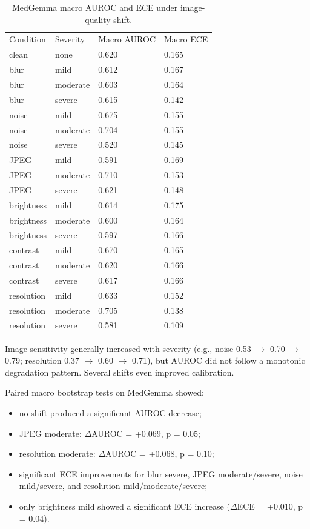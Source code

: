 \begin{table}[t]
\centering
\small
\begin{tabular}{llll}
\hline
Condition & Severity & Macro AUROC & Macro ECE \\
clean & none & 0.620 & 0.165 \\
blur & mild & 0.612 & 0.167 \\
blur & moderate & 0.603 & 0.164 \\
blur & severe & 0.615 & 0.142 \\
noise & mild & 0.675 & 0.155 \\
noise & moderate & 0.704 & 0.155 \\
noise & severe & 0.520 & 0.145 \\
JPEG & mild & 0.591 & 0.169 \\
JPEG & moderate & 0.710 & 0.153 \\
JPEG & severe & 0.621 & 0.148 \\
brightness & mild & 0.614 & 0.175 \\
brightness & moderate & 0.600 & 0.164 \\
brightness & severe & 0.597 & 0.166 \\
contrast & mild & 0.670 & 0.165 \\
contrast & moderate & 0.620 & 0.166 \\
contrast & severe & 0.617 & 0.166 \\
resolution & mild & 0.633 & 0.152 \\
resolution & moderate & 0.705 & 0.138 \\
resolution & severe & 0.581 & 0.109 \\
\hline
\end{tabular}
\caption{MedGemma macro AUROC and ECE under image-quality shift.}
\label{tab:shift}
\end{table}


Image sensitivity generally increased with severity (e.g., noise 0.53 $\rightarrow$ 0.70 $\rightarrow$ 0.79; resolution 0.37 $\rightarrow$ 0.60 $\rightarrow$ 0.71), but AUROC did not follow a monotonic degradation pattern. Several shifts even improved calibration.

Paired macro bootstrap tests on MedGemma showed:

\begin{itemize}
\item no shift produced a significant AUROC decrease;
\item JPEG moderate: $\Delta$AUROC = +0.069, p = 0.05;
\item resolution moderate: $\Delta$AUROC = +0.068, p = 0.10;
\item significant ECE improvements for blur severe, JPEG moderate/severe, noise mild/severe, and resolution mild/moderate/severe;
\item only brightness mild showed a significant ECE increase ($\Delta$ECE = +0.010, p = 0.04).
\end{itemize}

